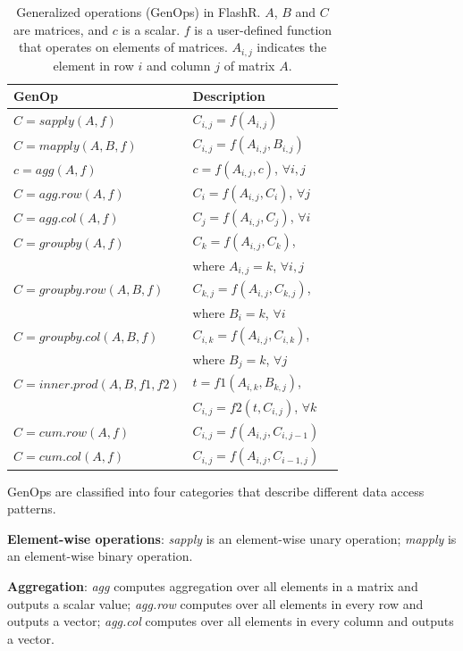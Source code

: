 \begin{table}
\begin{center}
\caption{Generalized operations (GenOps) in FlashR. $A$, $B$ and $C$ are
	matrices, and $c$ is a scalar. $f$ is a user-defined function that
	operates on elements of matrices. $A_{i,j}$ indicates the element
	in row $i$ and column $j$ of matrix $A$.}
\vspace{-10pt}
\footnotesize
\begin{tabular}{|l|l|l|}
\hline
GenOp & Description \\
\hline
$C=sapply(A, f)$ & $C_{i,j}=f(A_{i,j})$ \\
$C=mapply(A, B, f)$ & $C_{i,j}=f(A_{i,j}, B_{i,j})$ \\
\hline
$c=agg(A, f)$ & $c=f(A_{i,j}, c)$, $\forall i, j$ \\
$C=agg.row(A, f)$ & $C_i=f(A_{i,j}, C_i)$, $\forall j$ \\
$C=agg.col(A, f)$ & $C_j=f(A_{i,j}, C_j)$, $\forall i$ \\
\hline
$C=groupby(A, f)$ & $C_{k}=f(A_{i,j}, C_{k})$,\\ & where $A_{i, j}=k$, $\forall i,j$ \\
$C=groupby.row(A, B, f)$ & $C_{k,j}=f(A_{i,j}, C_{k,j})$,\\ & where $B_i=k$, $\forall i$ \\
$C=groupby.col(A, B, f)$ & $C_{i,k}=f(A_{i,j}, C_{i,k})$,\\ & where $B_j=k$, $\forall j$ \\
\hline
$C=inner.prod(A, B, f1, f2)$ & $t=f1(A_{i,k}, B_{k,j})$,
\\ & $C_{i,j}=f2(t, C_{i,j})$, $\forall k$ \\
\hline
$C=cum.row(A, f)$ & $C_{i,j}=f(A_{i,j}, C_{i,j-1})$ \\
$C=cum.col(A, f)$ & $C_{i,j}=f(A_{i,j}, C_{i-1,j})$ \\
\hline
\end{tabular}
\normalsize
\label{tbl:genops}
\vspace{-10pt}
\end{center}
\end{table}

GenOps are classified into four categories that describe different data access
patterns.

\noindent \textbf{Element-wise operations}:
\textit{sapply} is an element-wise unary operation; \textit{mapply}
is an element-wise binary operation.

\noindent \textbf{Aggregation}: \textit{agg} computes aggregation over
all elements in a matrix and outputs a scalar value; \textit{agg.row}
computes over all elements in every row and outputs a vector;
\textit{agg.col} computes over all elements in every column and
outputs a vector.

